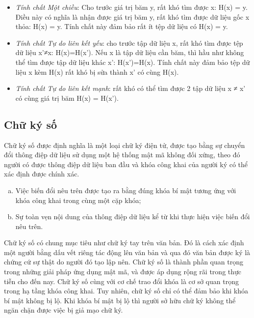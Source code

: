 \begin{itemize}
\item \emph{Tính chất Một chiều}: Cho trước giá trị băm y, rất khó tìm được x: H(x) = y. Điều này có nghĩa là nhận được giá trị băm y, rất khó tìm được dữ liệu gốc x thỏa: H(x) = y. Tính chất này đảm bảo rất ít tệp dữ liệu có H(x) = y.

\item \emph{Tính chất Tự do liên kết yếu}: cho trước tập dữ liệu x, rất khó tìm được tệp dữ liệu x’≠x: H(x)=H(x’). Nếu x là tập dữ liệu cần băm, thì hầu như không thể tìm được tập dữ liệu khác x’: H(x’)=H(x). Tính chất này đảm bảo tệp dữ liệu x kèm H(x) rất khó bị sửa thành x’ có cùng H(x).

\item \emph{Tính chất Tự do liên kết mạnh}: rất khó có thể tìm được 2 tập dữ liệu x ≠ x’ có cùng giá trị băm H(x) = H(x’).
\end{itemize}






\subsection{Chữ ký số}
Chữ ký số được định nghĩa là một loại chữ ký điện tử, được tạo bằng sự chuyển đổi thông điệp dữ liệu sử dụng một hệ thống mật mã không đối xứng, theo đó người có được thông điệp dữ liệu ban đầu và khóa công khai của người ký có thể xác định được chính xác.

\begin{enumerate}[a)]
\item Việc biến đổi nêu trên được tạo ra bằng đúng khóa bí mật tương ứng với khóa công khai trong cùng một cặp khóa;
\item Sự toàn vẹn nội dung của thông điệp dữ liệu kể từ khi thực hiện việc biến đổi nêu trên.
\end{enumerate}

Chữ ký số có chung mục tiêu như chữ ký tay trên văn bản. Đó là cách xác định một người bằng dấu vết riêng tác động lên văn bản và qua đó văn bản được ký là chứng cứ sự thật do người đó tạo lập nên. Chữ ký số là thành phần quan trọng trong những giải pháp ứng dụng mật mã, và được áp dụng rộng rãi trong thực tiễn cho đến nay. Chữ ký số cùng với cơ chế trao đổi khóa là cơ sở quan trọng trong hạ tầng khóa công khai. Tuy nhiên, chữ ký số chỉ có thể đảm bảo khi khóa bí mật không bị lộ. Khi khóa bí mật bị lộ thì người sở hữu chữ ký không thể ngăn chặn được việc bị giả mạo chữ ký.

